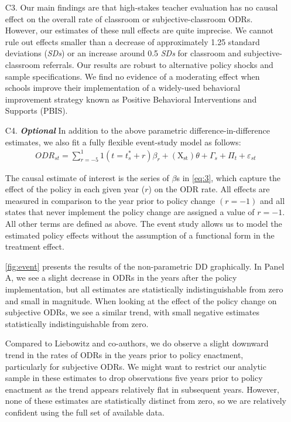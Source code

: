 \documentclass[a4paper, 11pt]{article}
\begin{document}
\begin{enumerate}



	\item[C3.] Our main findings are that high-stakes teacher evaluation has no causal effect on the overall rate of classroom or subjective-classroom ODRs. However, our estimates of these null effects are quite imprecise. We cannot rule out effects smaller than a decrease of approximately 1.25 standard deviations (\textit{SDs}) or an increase around 0.5 \textit{SDs} for classroom and subjective-classroom referrals. Our results are robust to alternative policy shocks and sample specifications. We find no evidence of a moderating effect when schools improve their implementation of a widely-used behavioral improvement strategy known as Positive Behavioral Interventions and Supports (PBIS). 
	
	\item[C4.]  \textbf{\textit{Optional }} In addition to the above parametric difference-in-difference estimates, we also fit a fully flexible event-study model as follows:
	\makeatletter
	\@hyper@itemfalse
	\makeatother
\begin{equation} \label{eq:3}
\begin{aligned}
ODR_{st}=\sum_{r=-5}^{1} 1\left(t=t_{s}^{*}+r\right) \beta_{r}+\left(\mathrm{X}_{\mathrm{st}}\right) \theta+\Gamma_{s}+\Pi_{t}+\varepsilon_{st}
\end{aligned}
\end{equation}

The causal estimate of interest is the series of $\beta$s in \autoref{eq:3}, which capture the effect of the policy in each given year ($r$) on the ODR rate. All effects are measured in comparison to the year prior to policy change $(r = -1)$ and all states that never implement the policy change are assigned a value of $r = -1$. All other terms are defined as above. The event study allows us to model the estimated policy effects without the assumption of a functional form in the treatment effect. 

\autoref{fig:event} presents the results of the non-parametric DD graphically. In Panel A, we see a slight decrease in ODRs in the years after the policy implementation, but all estimates are statistically indistinguishable from zero and small in magnitude. When looking at the effect of the policy change on subjective ODRs, we see a similar trend, with small negative estimates statistically indistinguishable from zero. 

Compared to Liebowitz and co-authors, we do observe a slight downward trend in the rates of ODRs in the years prior to policy enactment, particularly for subjective ODRs. We might want to restrict our analytic sample in these estimates to drop observations five years prior to policy enactment as the trend appears relatively flat in subsequent years. However, none of these estimates are statistically distinct from zero, so we are relatively confident using the full set of available data.



\end{enumerate}
\end{document}
